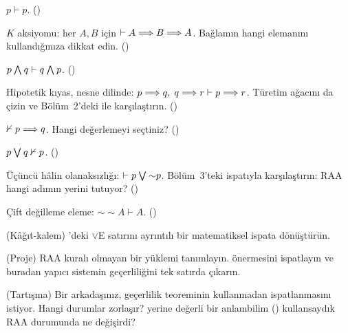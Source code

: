 \begin{alistirmalar}
 $p \vdash p$. ()

 $K$ aksiyomu: her $A, B$ için $\vdash A \Longrightarrow B \Longrightarrow A$.
Bağlamın hangi elemanını kullandığınıza dikkat edin. ()

 $p \mathbin{\textstyle\bigwedge} q \vdash q \mathbin{\textstyle\bigwedge} p$. ()

 Hipotetik kıyas, nesne dilinde:
$p \Longrightarrow q,\; q \Longrightarrow r \vdash p \Longrightarrow r$. Türetim ağacını da çizin ve
Bölüm~2'deki  ile karşılaştırın. ()

 $\nvdash p \Longrightarrow q$. Hangi değerlemeyi seçtiniz?
()

 $p \mathbin{\textstyle\bigvee} q \nvdash p$. ()

 Üçüncü hâlin olanaksızlığı: $\vdash p \mathbin{\textstyle\bigvee} {\sim}p$.
Bölüm~3'teki  ispatıyla karşılaştırın: RAA hangi
adımın yerini tutuyor? ()

 Çift değilleme eleme: ${\sim}{\sim}A \vdash A$. ()

 (Kâğıt-kalem) 'deki $\vee$E
satırını ayrıntılı bir matematiksel ispata dönüştürün.

 (Proje) RAA kuralı olmayan bir  yüklemi
tanımlayın.  önermesini ispatlayın ve
buradan yapıcı sistemin geçerliliğini tek satırda çıkarın.

 (Tartışma) Bir arkadaşınız, geçerlilik teoreminin
 kullanmadan ispatlanmasını istiyor. Hangi durumlar zorlaşır?
 yerine  değerli bir anlambilim ()
kullansaydık RAA durumunda ne değişirdi?
\end{alistirmalar}
